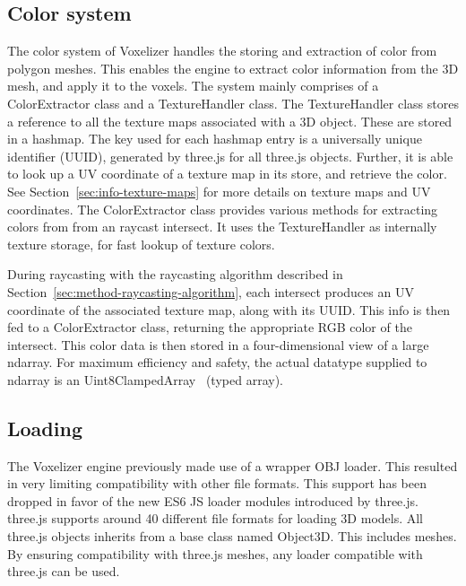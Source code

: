 \subsection{Color system}
The color system of Voxelizer handles the storing and extraction of color from polygon meshes. This enables the engine to extract color information from the 3D mesh, and apply it to the voxels. The system mainly comprises of a ColorExtractor class and a TextureHandler class. The TextureHandler class stores a reference to all the texture maps associated with a 3D object. These are stored in a hashmap. The key used for each hashmap entry is a universally unique identifier (UUID), generated by three.js for all three.js objects. Further, it is able to look up a UV coordinate of a texture map in its store, and retrieve the color. See Section~\ref{sec:info-texture-maps} for more details on texture maps and UV coordinates. The ColorExtractor class provides various methods for extracting colors from from an raycast intersect. It uses the TextureHandler as internally texture storage, for fast lookup of texture colors. 

During raycasting with the raycasting algorithm described in Section~\ref{sec:method-raycasting-algorithm}, each intersect produces an UV coordinate of the associated texture map, along with its UUID. This info is then fed to a ColorExtractor class, returning the appropriate RGB color of the intersect. This color data is then stored in a four-dimensional view of a large ndarray. For maximum efficiency and safety, the actual datatype supplied to ndarray is an Uint8ClampedArray~\cite{uint8clampedarray} (typed array).

\subsection{Loading}
The Voxelizer engine previously made use of a wrapper OBJ loader. This resulted in very limiting compatibility with other file formats. This support has been dropped in favor of the new ES6 JS loader modules introduced by three.js. three.js supports around 40 different file formats for loading 3D models. All three.js objects inherits from a base class named Object3D. This includes meshes. By ensuring compatibility with three.js meshes, any loader compatible with three.js can be used.

